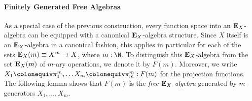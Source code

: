 {\paragraph{Finitely Generated Free Algebras}
As a special case of the previous construction, every function space into an \(\mathbf{E}_X\)-algebra can be equipped with a canonical \(\mathbf{E}_X\)-algebra structure.
Since \(X\) itself is an \(\mathbf{E}_X\)-algebra in a canonical fashion, this applies in particular for each of the sets \(\mathbf{E}_X(m)\equiv X^m\to X\), where \(m:\N\).
To distinguish this \(\mathbf{E}_X\)-algebra from the set \(\mathbf{E}_X(m)\) of \(m\)-ary operations, we denote it by \(F(m)\).
Moreover, we write \(X_1\colonequiv \pi^m_1, \dots X_m\colonequiv\pi^m_m : F(m)\) for the projection functions.
The following lemma shows that \(F(m)\) is the \emph{free \(\mathbf{E}_X\)-algebra} generated by \(m\) generators \(X_1,\dots,X_m\).

}

